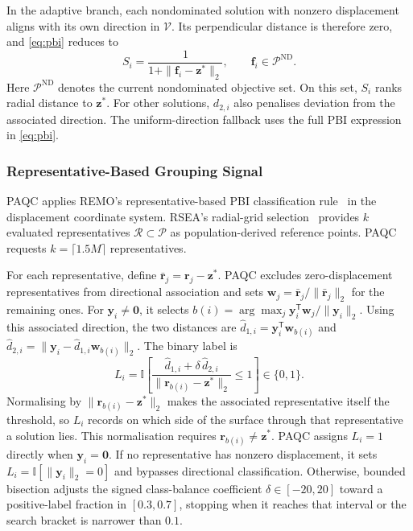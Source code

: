 \documentclass[final,5p,times,twocolumn]{elsarticle}
\newcommand{\vf}{\mathbf{f}}
\newcommand{\vy}{\mathbf{y}}
\newcommand{\vw}{\mathbf{w}}
\newcommand{\vr}{\mathbf{r}}
\newcommand{\vz}{\mathbf{z}}
\begin{document}
In the adaptive branch, each nondominated solution with nonzero displacement
aligns with its own direction in $\mathcal{V}$. Its perpendicular distance is
therefore zero, and \eqref{eq:pbi} reduces to
\begin{equation}
S_i=\frac{1}{1+\|\vf_i-\vz^{*}\|_2},
\qquad \vf_i\in\mathcal{P}^{\mathrm{ND}}.
\label{eq:pbi-nd}
\end{equation}
Here $\mathcal{P}^{\mathrm{ND}}$ denotes the current nondominated objective set.
On this set, $S_i$ ranks radial distance to $\vz^{*}$. For other solutions,
$d_{2,i}$ also penalises deviation from the associated direction.
The uniform-direction fallback uses the full PBI expression in \eqref{eq:pbi}.

\subsubsection{Representative-Based Grouping Signal}
\label{sec:method:paqc:coarse}

PAQC applies REMO's representative-based PBI classification rule~\cite{ref:remo}
in the displacement coordinate system. RSEA's radial-grid selection~\cite{ref:rsea}
provides $k$ evaluated representatives $\mathcal{R}\subset\mathcal{P}$ as
population-derived reference points. PAQC requests $k=\lceil1.5M\rceil$ representatives.

For each representative, define $\bar{\vr}_j=\vr_j-\vz^{*}$.
PAQC excludes zero-displacement representatives from directional association
and sets $\vw_j=\bar{\vr}_j/\|\bar{\vr}_j\|_2$ for the remaining ones.
For $\vy_i\ne\boldsymbol{0}$, it selects
$b(i)=\arg\max_j\vy_i^{\mathsf T}\vw_j/\|\vy_i\|_2$.
Using this associated direction, the two distances are
$\hat d_{1,i}=\vy_i^{\mathsf T}\vw_{b(i)}$ and
$\hat d_{2,i}=\|\vy_i-\hat d_{1,i}\vw_{b(i)}\|_2$.
The binary label is
\begin{equation}
L_i=\mathbb{I}\!\left[
\frac{\hat d_{1,i}+\delta\,\hat d_{2,i}}
     {\|\vr_{b(i)}-\vz^{*}\|_2}\leq1\right]\in\{0,1\}.
\label{eq:label-bin}
\end{equation}
Normalising by $\|\vr_{b(i)}-\vz^{*}\|_2$ makes the associated representative
itself the threshold, so $L_i$ records on which side of the surface through that
representative a solution lies. This normalisation requires
$\vr_{b(i)}\ne\vz^{*}$. PAQC assigns $L_i=1$ directly when
$\vy_i=\boldsymbol{0}$. If no representative has nonzero displacement,
it sets $L_i=\mathbb{I}[\|\vy_i\|_2=0]$ and bypasses directional classification.
Otherwise, bounded bisection adjusts the signed class-balance coefficient
$\delta\in[-20,20]$ toward a positive-label fraction in $[0.3,0.7]$,
stopping when it reaches that interval or the search bracket is narrower than
$0.1$.
\end{document}
